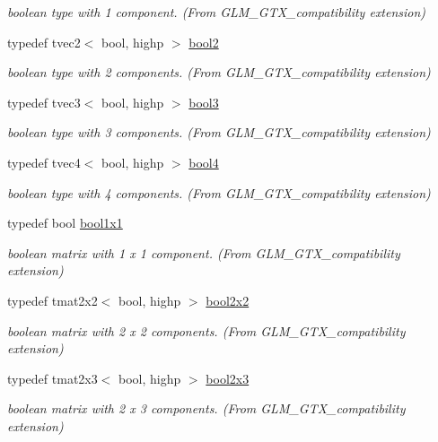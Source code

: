 \begin{DoxyCompactItemize}
\begin{DoxyCompactList}\small\item\em boolean type with 1 component. (From G\+L\+M\+\_\+\+G\+T\+X\+\_\+compatibility extension) \end{DoxyCompactList}\item 
typedef tvec2$<$ bool, highp $>$ \hyperlink{group__gtx__compatibility_gabe088d78d539d2a98a2a04ab798fec1a}{bool2}
\begin{DoxyCompactList}\small\item\em boolean type with 2 components. (From G\+L\+M\+\_\+\+G\+T\+X\+\_\+compatibility extension) \end{DoxyCompactList}\item 
typedef tvec3$<$ bool, highp $>$ \hyperlink{group__gtx__compatibility_gab7658aa2e0688b8ac7e640cf7e405c1e}{bool3}
\begin{DoxyCompactList}\small\item\em boolean type with 3 components. (From G\+L\+M\+\_\+\+G\+T\+X\+\_\+compatibility extension) \end{DoxyCompactList}\item 
typedef tvec4$<$ bool, highp $>$ \hyperlink{group__gtx__compatibility_ga141861edebf999f94938944f0fb0777a}{bool4}
\begin{DoxyCompactList}\small\item\em boolean type with 4 components. (From G\+L\+M\+\_\+\+G\+T\+X\+\_\+compatibility extension) \end{DoxyCompactList}\item 
typedef bool \hyperlink{group__gtx__compatibility_ga98d9d3da22aebc872ba38ce5afa0eff7}{bool1x1}
\begin{DoxyCompactList}\small\item\em boolean matrix with 1 x 1 component. (From G\+L\+M\+\_\+\+G\+T\+X\+\_\+compatibility extension) \end{DoxyCompactList}\item 
typedef tmat2x2$<$ bool, highp $>$ \hyperlink{group__gtx__compatibility_gaeb49db4b236907ba11f5b9117274b5d8}{bool2x2}
\begin{DoxyCompactList}\small\item\em boolean matrix with 2 x 2 components. (From G\+L\+M\+\_\+\+G\+T\+X\+\_\+compatibility extension) \end{DoxyCompactList}\item 
typedef tmat2x3$<$ bool, highp $>$ \hyperlink{group__gtx__compatibility_ga2d7e2c79179868a41d1f9f7a63f2ae52}{bool2x3}
\begin{DoxyCompactList}\small\item\em boolean matrix with 2 x 3 components. (From G\+L\+M\+\_\+\+G\+T\+X\+\_\+compatibility extension) \end{DoxyCompactList}\item 

\end{DoxyCompactItemize}
